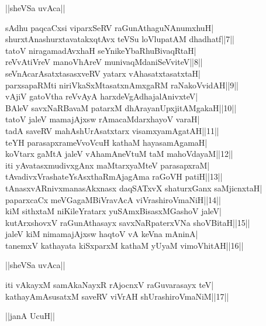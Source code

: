 \documentclass{article}
\begin{document}
\begin{center}
||sheVSa uvAca||
\end{center}

sAdhu paqcaCxsi viparxSeRV raGunAthaguNAnumxhuH|\\
shurxtAnashurxtavatakxqtAvx teVSu loVlupatAM dhadhatf||7||\\
tatoV niragamadAvxhaH seYnikeYbaRhuBivaqRtaH|\\
reVvAtiVreV manoVhAreV munivaqMdaniSeVviteV||8||\\
seVnAcarAsatxtasasxveRV yatarx vAhasatxtasatxtaH|\\
parxsapaRMti niriVkaSxMtasatxnAmxgaRM raNakoVvidAH||9||\\
vAjiV gatoVtha reVvAyA harxdeVgAdhajalAnivxteV|\\
BAleV savxNaRBavaM patarxM dhArayanUpxjitAMgakaH||10||\\
tatoV jaleV mamajAjxsw rAmacaMdarxhayoV varaH|\\
tadA saveRV mahAshUrAsatxtarx visamxyamAgatAH||11||\\
teYH parasapxrameVvoVcuH kathaM hayasamAgamaH|\\
koVtarx gaMtA jaleV vAhamAneVtuM taM mahoVdayaM||12||\\
iti yAvatasxmudivxgAnx maMtarxyaMteV parasapxraM|\\
tAvadivxVrashateYsAsxthaRmAjagAma raGoVH patiH||13||\\
tAnasxvARnivxmanasAkxnasx daqSATxvX shaturxGanx saMjicnxtaH|\\
paparxcaCx meVGagaMBiVravAcA viVrashiroVmaNiH||14||\\
kiM sithxtaM niKileYratarx yuSAmxBisasxMGashoV jaleV|\\
kutArxshovxV raGunAthasayx savxNaRpaterxVNa shoVBitaH||15||\\
jaleV kiM nimamajAjxsw haqtoV vA keVna mAninA|\\
tanemxV kathayata kiSxparxM kathaM yUyaM vimoVhitAH||16||\\

\begin{center}
||sheVSa uvAca||
\end{center}

iti vAkayxM samAkaNayxR rAjocnxV raGuvarasayx teV|\\
kathayAmAsusatxM saveRV viVrAH shUrashiroVmaNiM||17||\\

\begin{center}
||janA UcuH||
\end{center}
\end{document}
